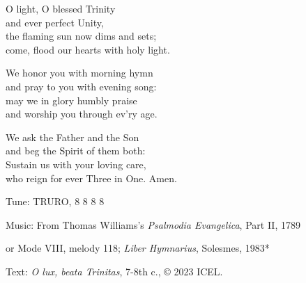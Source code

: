 \hymn

\begin{hymnverse}
O light, O blessed Trinity\\
and ever perfect Unity,\\
the flaming sun now dims and sets;\\
come, flood our hearts with holy light.

We honor you with morning hymn\\
and pray to you with evening song:\\
may we in glory humbly praise\\
and worship you through ev’ry age.

We ask the Father and the Son\\
and beg the Spirit of them both:\\
Sustain us with your loving care,\\
who reign for ever Three in One. Amen.
\end{hymnverse}

\begin{hymnsource}
Tune: TRURO, 8 8 8 8

Music: From Thomas Williams’s \emph{Psalmodia Evangelica}, Part II, 1789

or Mode VIII, melody 118; \emph{Liber Hymnarius}, Solesmes, 1983*

Text: \emph{O lux, beata Trinitas}, 7-8th c., © 2023 ICEL.
\end{hymnsource}